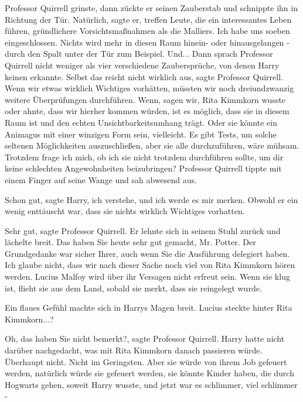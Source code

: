 Professor Quirrell grinste, dann zückte er seinen Zauberstab und schnippte ihn
in Richtung der Tür. \glqq Natürlich\grqq{}, sagte er, \glqq treffen Leute, die
ein interessantes Leben führen, gründlichere Vorsichtsmaßnahmen als die
Malliers. Ich habe uns soeben eingeschlossen. Nichts wird mehr in diesen Raum
hinein- oder hinausgelangen - durch den Spalt unter der Tür zum Beispiel.
Und...\grqq{} Dann sprach Professor Quirrell nicht weniger als vier verschiedene
Zaubersprüche, von denen Harry keinen erkannte. \glqq Selbst das reicht nicht
wirklich aus\grqq{}, sagte Professor Quirrell. \glqq Wenn wir etwas wirklich
Wichtiges vorhätten, müssten wir noch dreiundzwanzig weitere Überprüfungen
durchführen. Wenn, sagen wir, Rita Kimmkorn wusste oder ahnte, dass wir hierher
kommen würden, ist es möglich, dass sie in diesem Raum ist und den echten
Unsichtbarkeitsumhang trägt. Oder sie könnte ein Animagus mit einer winzigen
Form sein, vielleicht. Es gibt Tests, um solche seltenen Möglichkeiten
auszuschließen, aber sie alle durchzuführen, wäre mühsam. Trotzdem frage ich
mich, ob ich sie nicht trotzdem durchführen sollte, um dir keine schlechten
Angewohnheiten beizubringen?\grqq{} Professor Quirrell tippte mit einem Finger
auf seine Wange und sah abwesend aus.

\glqq Schon gut\grqq{}, sagte Harry, \glqq ich verstehe, und ich werde es mir
merken.\grqq{} Obwohl er ein wenig enttäuscht war, dass sie nichts wirklich
Wichtiges vorhatten.

\glqq Sehr gut\grqq{}, sagte Professor Quirrell. Er lehnte sich in seinem Stuhl
zurück und lächelte breit. \glqq Das haben Sie heute sehr gut gemacht, Mr.
Potter. Der Grundgedanke war sicher Ihrer, auch wenn Sie die Ausführung
delegiert haben. Ich glaube nicht, dass wir nach dieser Sache noch viel von Rita
Kimmkorn hören werden. Lucius Malfoy wird über ihr Versagen nicht erfreut sein.
Wenn sie klug ist, flieht sie aus dem Land, sobald sie merkt, dass sie
reingelegt wurde.\grqq{}

Ein flaues Gefühl machte sich in Harrys Magen breit. \glqq Lucius steckte hinter
Rita Kimmkorn...?\grqq{}

\glqq Oh, das haben Sie nicht bemerkt?\grqq{}, sagte Professor Quirrell. Harry
hatte nicht darüber nachgedacht, was mit Rita Kimmkorn danach passieren würde.
Überhaupt nicht. Nicht im Geringsten. Aber sie würde von ihrem Job gefeuert
werden, natürlich würde sie gefeuert werden, sie könnte Kinder haben, die durch
Hogwarts gehen, soweit Harry wusste, und jetzt war es schlimmer, viel schlimmer
-

